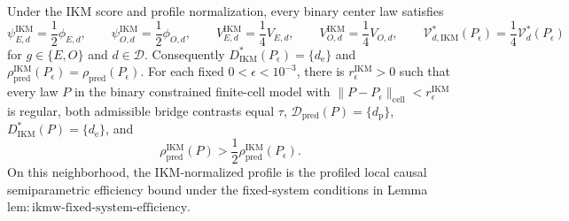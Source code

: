 Under the IKM score and profile normalization, every binary center law satisfies
\[
 \psi_{E,d}^{\mathrm{IKM}}=\frac12\phi_{E,d},
 \qquad
 \psi_{O,d}^{\mathrm{IKM}}=\frac12\phi_{O,d},
 \qquad
 V_{E,d}^{\mathrm{IKM}}=\frac14V_{E,d},
 \qquad
 V_{O,d}^{\mathrm{IKM}}=\frac14V_{O,d},
 \qquad
 \mathcal V_{d,\mathrm{IKM}}^*(P_\epsilon)
 =\frac14\mathcal V_d^*(P_\epsilon)
\]
for \(g\in\{E,O\}\) and \(d\in\mathcal D\). Consequently \(D_{\mathrm{IKM}}^*(P_\epsilon)=\{d_{\mathrm e}\}\) and \(\rho_{\mathrm{pred}}^{\mathrm{IKM}}(P_\epsilon)=\rho_{\mathrm{pred}}(P_\epsilon)\). For each fixed \(0<\epsilon<10^{-3}\), there is \(r_\epsilon^{\mathrm{IKM}}>0\) such that every law \(P\) in the binary constrained finite-cell model with \(\|P-P_\epsilon\|_{\mathrm{cell}}<r_\epsilon^{\mathrm{IKM}}\) is regular, both admissible bridge contrasts equal \(\tau\), \(\mathcal D_{\mathrm{pred}}(P)=\{d_{\mathrm p}\}\), \(D_{\mathrm{IKM}}^*(P)=\{d_{\mathrm e}\}\), and
\[
 \rho_{\mathrm{pred}}^{\mathrm{IKM}}(P)
 >\frac12\rho_{\mathrm{pred}}^{\mathrm{IKM}}(P_\epsilon).
\]
On this neighborhood, the IKM-normalized profile is the profiled local causal semiparametric efficiency bound under the fixed-system conditions in Lemma~\(\mathrm{lem{:}ikmw\text{-}fixed\text{-}system\text{-}efficiency}\).